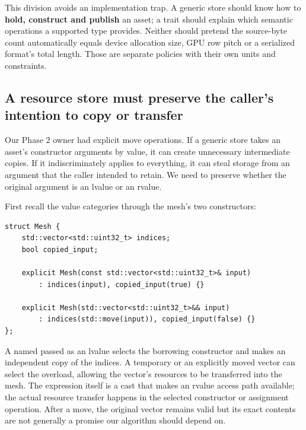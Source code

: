 This division avoids an implementation trap. A generic store should know how to \textbf{hold, construct and publish} an asset; a trait should explain which semantic operations a supported type provides. Neither should pretend the source-byte count automatically equals device allocation size, GPU row pitch or a serialized format's total length. Those are separate policies with their own units and constraints.

\subsection{A resource store must preserve the caller's intention to copy or transfer}\label{05-engine-i-ch005-a-resource-store-must-preserve-the-callers-intention-to-copy-or-transfer}

\hypertarget{05-engine-i-ch005-a-resource-store-must-preserve-the-callers-intention-to-copy-or-transfer}{}

Our Phase 2 owner had explicit move operations. If a generic store takes an asset's constructor arguments by value, it can create unnecessary intermediate copies. If it indiscriminately applies  to everything, it can steal storage from an argument that the caller intended to retain. We need to preserve whether the original argument is an lvalue or an rvalue.

First recall the value categories through the mesh's two constructors:

\begin{verbatim}
struct Mesh {
    std::vector<std::uint32_t> indices;
    bool copied_input;

    explicit Mesh(const std::vector<std::uint32_t>& input)
        : indices(input), copied_input(true) {}

    explicit Mesh(std::vector<std::uint32_t>&& input)
        : indices(std::move(input)), copied_input(false) {}
};
\end{verbatim}

A named  passed as an lvalue selects the borrowing  constructor and makes an independent copy of the indices. A temporary or an explicitly moved vector can select the \BookInlineCode{{\&}{\&}}{\&\&} overload, allowing the vector's resources to be transferred into the mesh. The  expression itself is a cast that makes an rvalue access path available; the actual resource transfer happens in the selected constructor or assignment operation. After a move, the original vector remains valid but its exact contents are not generally a promise our algorithm should depend on.

